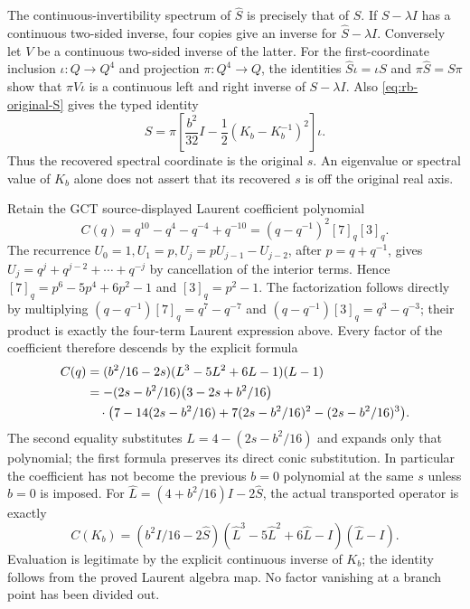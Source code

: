 The continuous-invertibility spectrum of $\widehat S$ is precisely
that of $S$. If $S-\lambda I$ has a continuous two-sided inverse,
four copies give an inverse for $\widehat S-\lambda I$.
Conversely let $V$ be a continuous two-sided inverse of the latter.
For the first-coordinate inclusion $\iota:Q\to Q^4$ and projection
$\pi:Q^4\to Q$, the identities
$\widehat S\iota=\iota S$ and $\pi\widehat S=S\pi$ show that
$\pi V\iota$ is a continuous left and right inverse of
$S-\lambda I$. Also \eqref{eq:rb-original-S} gives the typed identity
\[
 S=\pi\left[\frac{b^2}{32}I
                 -\frac12(K_b-K_b^{-1})^2\right]\iota.
\]
Thus the recovered spectral coordinate is the original $s$.
An eigenvalue or spectral value of $K_b$ alone does not assert that
its recovered $s$ is off the original real axis.

Retain the GCT source-displayed Laurent coefficient polynomial
\[
 C(q)=q^{10}-q^4-q^{-4}+q^{-10}
      =(q-q^{-1})^2[7]_q[3]_q.
\]
The recurrence $U_0=1,U_1=p,U_j=pU_{j-1}-U_{j-2}$, after
$p=q+q^{-1}$, gives $U_j=q^j+q^{j-2}+\cdots+q^{-j}$ by cancellation
of the interior terms. Hence $[7]_q=p^6-5p^4+6p^2-1$ and
$[3]_q=p^2-1$. The factorization follows directly by multiplying
$(q-q^{-1})[7]_q=q^7-q^{-7}$ and
$(q-q^{-1})[3]_q=q^3-q^{-3}$; their product is exactly the
four-term Laurent expression above. Every factor of the coefficient
therefore descends by the explicit formula
\begin{align}
 C(q)&=(b^2/16-2s)(L^3-5L^2+6L-1)(L-1)\notag\\
 &=-(2s-b^2/16)\bigl(3-2s+b^2/16\bigr)\notag\\
 &\quad\cdot
 \bigl(7-14(2s-b^2/16)+7(2s-b^2/16)^2-(2s-b^2/16)^3\bigr).
 \label{eq:rb-C}
\end{align}
The second equality substitutes $L=4-(2s-b^2/16)$ and expands
only that polynomial; the first formula preserves its direct
conic substitution. In particular the coefficient has not become
the previous $b=0$ polynomial at the same $s$ unless $b=0$ is imposed.
For $\widehat L=(4+b^2/16)I-2\widehat S$, the actual transported
operator is exactly
\[
 C(K_b)=(b^2I/16-2\widehat S)
 (\widehat L^3-5\widehat L^2+6\widehat L-I)(\widehat L-I).
\]
Evaluation is legitimate by the explicit continuous inverse of $K_b$;
the identity follows from the proved Laurent algebra map. No factor
vanishing at a branch point has been divided out.

